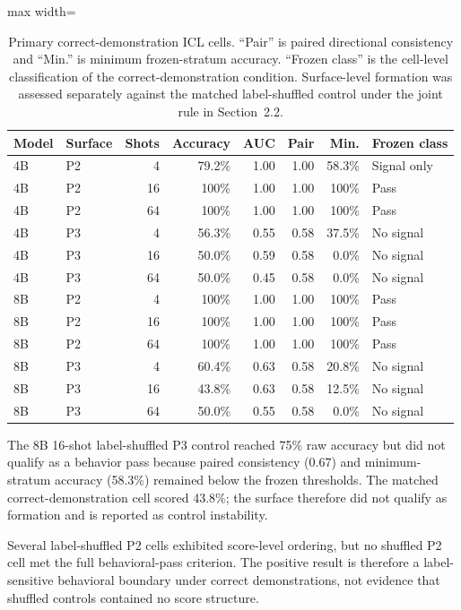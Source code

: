 \documentclass[10pt,a4paper]{article}
\begin{document}
\begin{table}[H]
\centering
\caption{Primary correct-demonstration ICL cells. ``Pair'' is paired directional consistency and ``Min.'' is minimum frozen-stratum accuracy. ``Frozen class'' is the cell-level classification of the correct-demonstration condition. Surface-level formation was assessed separately against the matched label-shuffled control under the joint rule in Section~2.2.}
\label{tab:primaryicl}
\begin{adjustbox}{max width=\textwidth}
\begin{tabular}{llrrrrrl}
\toprule
Model & Surface & Shots & Accuracy & AUC & Pair & Min. & Frozen class \\
\midrule
4B & P2 & 4  & 79.2\% & 1.00 & 1.00 & 58.3\% & Signal only \\
4B & P2 & 16 & 100\%  & 1.00 & 1.00 & 100\%  & Pass \\
4B & P2 & 64 & 100\%  & 1.00 & 1.00 & 100\%  & Pass \\
4B & P3 & 4  & 56.3\% & 0.55 & 0.58 & 37.5\% & No signal \\
4B & P3 & 16 & 50.0\% & 0.59 & 0.58 & 0.0\%  & No signal \\
4B & P3 & 64 & 50.0\% & 0.45 & 0.58 & 0.0\%  & No signal \\
8B & P2 & 4  & 100\%  & 1.00 & 1.00 & 100\%  & Pass \\
8B & P2 & 16 & 100\%  & 1.00 & 1.00 & 100\%  & Pass \\
8B & P2 & 64 & 100\%  & 1.00 & 1.00 & 100\%  & Pass \\
8B & P3 & 4  & 60.4\% & 0.63 & 0.58 & 20.8\% & No signal \\
8B & P3 & 16 & 43.8\% & 0.63 & 0.58 & 12.5\% & No signal \\
8B & P3 & 64 & 50.0\% & 0.55 & 0.58 & 0.0\%  & No signal \\
\bottomrule
\end{tabular}
\end{adjustbox}
\end{table}

The 8B 16-shot label-shuffled P3 control reached 75\% raw accuracy but did not qualify as a behavior pass because paired consistency (0.67) and minimum-stratum accuracy (58.3\%) remained below the frozen thresholds. The matched correct-demonstration cell scored 43.8\%; the surface therefore did not qualify as formation and is reported as control instability.

Several label-shuffled P2 cells exhibited score-level ordering, but no shuffled P2 cell met the full behavioral-pass criterion. The positive result is therefore a label-sensitive behavioral boundary under correct demonstrations, not evidence that shuffled controls contained no score structure.
\end{document}
